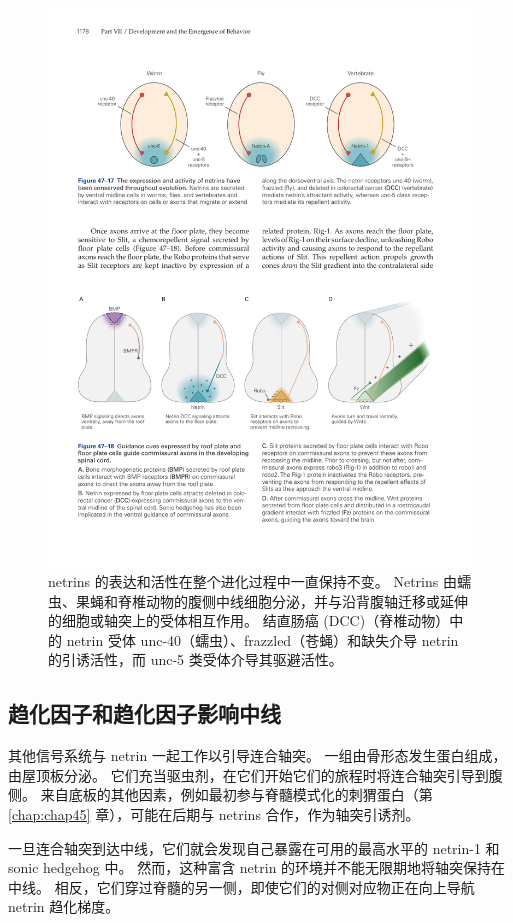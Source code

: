 \begin{figure}[htbp]
	\centering
	\includegraphics[width=0.8\linewidth]{chap47/fig_47_17}
	\caption{netrins 的表达和活性在整个进化过程中一直保持不变。 Netrins 由蠕虫、果蝇和脊椎动物的腹侧中线细胞分泌，并与沿背腹轴迁移或延伸的细胞或轴突上的受体相互作用。 结直肠癌 (DCC)（脊椎动物）中的 netrin 受体 unc-40（蠕虫）、frazzled（苍蝇）和缺失介导 netrin 的引诱活性，而 unc-5 类受体介导其驱避活性。}
	\label{fig:47_17}
\end{figure}

\subsection{趋化因子和趋化因子影响中线}
其他信号系统与 netrin 一起工作以引导连合轴突。 一组由骨形态发生蛋白组成，由屋顶板分泌。 它们充当驱虫剂，在它们开始它们的旅程时将连合轴突引导到腹侧。 来自底板的其他因素，例如最初参与脊髓模式化的刺猬蛋白（第 \ref{chap:chap45} 章），可能在后期与 netrins 合作，作为轴突引诱剂。

一旦连合轴突到达中线，它们就会发现自己暴露在可用的最高水平的 netrin-1 和 sonic hedgehog 中。 然而，这种富含 netrin 的环境并不能无限期地将轴突保持在中线。 相反，它们穿过脊髓的另一侧，即使它们的对侧对应物正在向上导航 netrin 趋化梯度。

